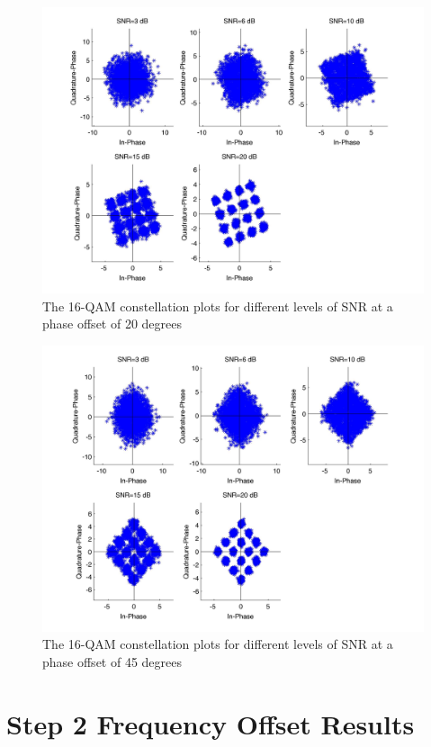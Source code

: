 \documentclass[]{article}
\begin{document}
\begin{figure}[H]
\centering
\hspace*{-2cm}\includegraphics[width=1.3\textwidth]{qam16Constpo3.jpg}
\caption{The 16-QAM constellation plots for different levels of SNR at a phase offset of 20 degrees}
\end{figure}

\begin{figure}[H]
\centering
\hspace*{-2cm}\includegraphics[width=1.3\textwidth]{qam16Constpo4.jpg}
\caption{The 16-QAM constellation plots for different levels of SNR at a phase offset of 45 degrees}
\end{figure}
\newpage
\section{Step 2 Frequency Offset Results}
\label{sec:results_fo}
\end{document}
